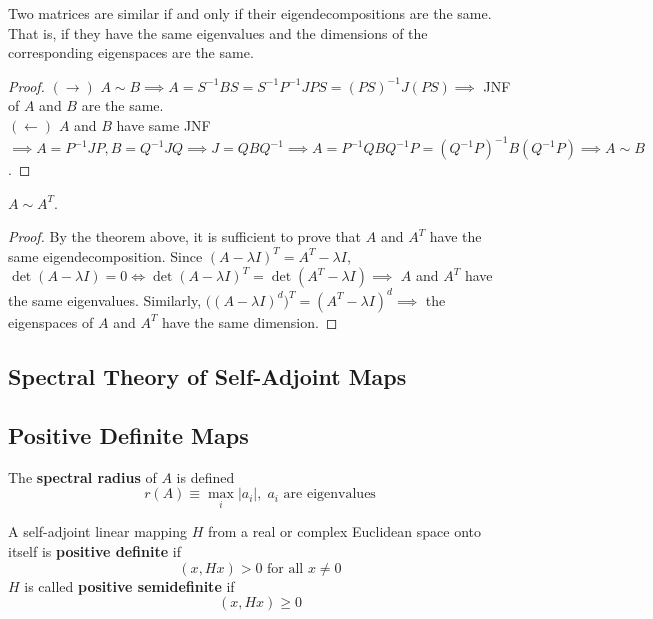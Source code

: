   \begin{theorem}
    Two matrices are similar if and only if their eigendecompositions are the same. That is, if they have the same eigenvalues and the dimensions of the corresponding eigenspaces are the same. 
  \end{theorem}
  \begin{proof}
    $(\rightarrow)$ $A \sim B \implies A = S^{-1} B S = S^{-1} P^{-1} J P S = (PS)^{-1} J (PS) \implies$ JNF of $A$ and $B$ are the same.  \\
    $(\leftarrow)$ $A$ and $B$ have same JNF $\implies A = P^{-1} J P, B = Q^{-1} J Q \implies J = Q B Q^{-1} \implies A = P^{-1} Q B Q^{-1} P = (Q^{-1} P)^{-1} B (Q^{-1} P) \implies A \sim B$. 
  \end{proof}

  \begin{theorem}
    $A \sim A^T$. 
  \end{theorem}
  \begin{proof}
    By the theorem above, it is sufficient to prove that $A$ and $A^T$ have the same eigendecomposition. Since $(A - \lambda I)^T = A^T - \lambda I$, $\det{(A - \lambda I)} = 0 \iff \det{(A - \lambda I)^T} = \det{(A^T - \lambda I)} \implies $ $A$ and $A^T$ have the same eigenvalues. Similarly, $\big( (A - \lambda I)^d \big)^T = (A^T - \lambda I)^d \implies$ the eigenspaces of $A$ and $A^T$ have the same dimension. 
  \end{proof}

\subsection{Spectral Theory of Self-Adjoint Maps}

\subsection{Positive Definite Maps}

  \begin{definition}
    The \textbf{spectral radius} of $A$ is defined
    \begin{equation}
      r(A) \equiv \max_i |a_i|, \; a_i \text{ are eigenvalues}
    \end{equation}
  \end{definition}

  \begin{definition}
    A self-adjoint linear mapping $H$ from a real or complex Euclidean space onto itself is \textbf{positive definite} if 
    \begin{equation}
      (x, H x) > 0 \text{ for all } x \neq 0
    \end{equation}
    $H$ is called \textbf{positive semidefinite} if 
    \begin{equation}
      (x, H x) \geq 0
    \end{equation}
  \end{definition}

